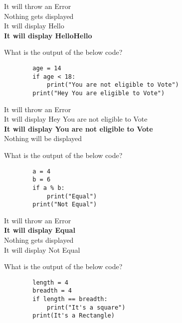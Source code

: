 \documentclass{exam}
\begin{document}
\begin{questions}
      \begin{oneparchoices}
          \choice It will throw an Error \\
          \choice Nothing gets displayed \\
          \choice It will display Hello \\
          \choice  \textbf{It will display HelloHello}
      \end{oneparchoices}

      \question What is the output of the below code?

      \begin{verbatim}
        age = 14
        if age < 18:
            print("You are not eligible to Vote")
        print("Hey You are eligible to Vote")
      \end{verbatim}

      \begin{oneparchoices}
          \choice It will throw an Error \\
          \choice It will display Hey You are not eligible to Vote \\
          \choice \textbf{It will display You are not eligible to Vote} \\
          \choice Nothing will be displayed
      \end{oneparchoices}

      \question What is the output of the below code?

      \begin{verbatim}
        a = 4
        b = 6
        if a % b:
            print("Equal")
        print("Not Equal")
      \end{verbatim}

      \begin{oneparchoices}
          \choice It will throw an Error \\
          \choice \textbf{It will display Equal} \\
          \choice  Nothing gets displayed \\
          \choice It will display Not Equal
      \end{oneparchoices}

      \question What is the output of the below code?

      \begin{verbatim}
        length = 4
        breadth = 4
        if length == breadth:
            print("It's a square")
        print(It's a Rectangle)
      \end{verbatim}


\end{questions}
\end{document}
